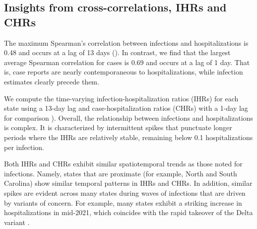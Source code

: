 \subsection{Insights from cross-correlations, IHRs and CHRs}
\label{sec:lagged-correlations}

The maximum Spearman's correlation between infections and hospitalizations
is 0.48 and occurs at a lag of 13 days (). 
In contrast, we find that the
largest average Spearman correlation for cases is 0.69 and occurs at a lag of 1
day. That is, case reports are nearly contemporaneous to hospitalizations, while
infection estimates clearly precede them. 

We compute the time-varying infection-hospitalization ratios (IHRs) for each
state using a 13-day lag and case-hospitalization ratios (CHRs) with a 1-day lag
for comparison ). Overall, the relationship between
infections and hospitalizations is complex. It is characterized by intermittent
spikes that punctuate longer periods where the IHRs are relatively stable,
remaining below 0.1 hospitalizations per infection. 

Both IHRs and CHRs exhibit similar spatiotemporal trends as those noted
for infections. Namely, states that are proximate (for example, North and South
Carolina) show similar temporal patterns in IHRs and CHRs. In addition, similar
spikes are evident across many states during waves of infections that are driven
by variants of concern. For example, many states exhibit a striking increase in
hospitalizations in mid-2021, which coincides with the rapid takeover of the
Delta variant \citep{hodcroft2021covariants}.





